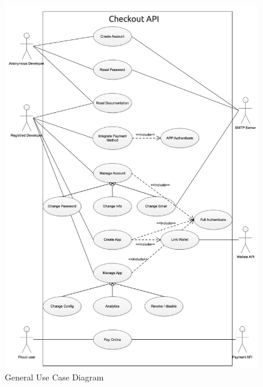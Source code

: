 \begin{spacing}{1.2}
\begin{figure}[H]\centering
\includegraphics[width=\textwidth,height=\textheight,keepaspectratio]{GeneralUseCase.png}
\caption{General Use Case Diagram}
\label{fig:usecasediagram}
\end{figure}


\end{spacing}
